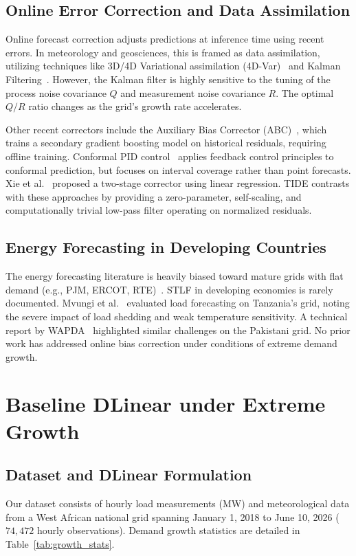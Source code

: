 \documentclass[10pt,twocolumn,letterpaper]{article}
\begin{document}
\subsection{Online Error Correction and Data Assimilation}
Online forecast correction adjusts predictions at inference time using recent errors. In meteorology and geosciences, this is framed as data assimilation, utilizing techniques like 3D/4D Variational assimilation (4D-Var)~\cite{farchi2024neural} and Kalman Filtering~\cite{harvey1989forecasting}. However, the Kalman filter is highly sensitive to the tuning of the process noise covariance $Q$ and measurement noise covariance $R$. The optimal $Q/R$ ratio changes as the grid's growth rate accelerates.

Other recent correctors include the Auxiliary Bias Corrector (ABC)~\cite{mouatadid2023abc}, which trains a secondary gradient boosting model on historical residuals, requiring offline training. Conformal PID control~\cite{angelopoulos2023conformal} applies feedback control principles to conformal prediction, but focuses on interval coverage rather than point forecasts. Xie et al.~\cite{xie2025two} proposed a two-stage corrector using linear regression. TIDE contrasts with these approaches by providing a zero-parameter, self-scaling, and computationally trivial low-pass filter operating on normalized residuals.

\subsection{Energy Forecasting in Developing Countries}
The energy forecasting literature is heavily biased toward mature grids with flat demand (e.g., PJM, ERCOT, RTE)~\cite{sobhani2020electricity}. STLF in developing economies is rarely documented. Mvungi et al.~\cite{mvungi2021load} evaluated load forecasting on Tanzania's grid, noting the severe impact of load shedding and weak temperature sensitivity. A technical report by WAPDA~\cite{wapda2020load} highlighted similar challenges on the Pakistani grid. No prior work has addressed online bias correction under conditions of extreme demand growth.

\section{Baseline DLinear under Extreme Growth}
\label{sec:baseline}

\subsection{Dataset and DLinear Formulation}
Our dataset consists of hourly load measurements (MW) and meteorological data from a West African national grid spanning January 1, 2018 to June 10, 2026 ($74,472$ hourly observations). Demand growth statistics are detailed in Table~\ref{tab:growth_stats}.
\end{document}
